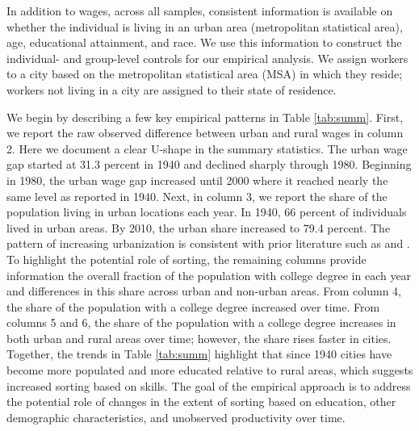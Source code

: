 \documentclass[12pt]{article}
\begin{document}
In addition to wages, across all samples, consistent information is available on whether the individual is living in an urban area (metropolitan statistical area), age, educational attainment, and race.
We use this information to construct the individual- and group-level controls for our empirical analysis.
We assign workers to a city based on the metropolitan statistical area (MSA) in which they reside; workers not living in a city are assigned to their state of residence. 

We begin by describing a few key empirical patterns in Table \ref{tab:summ}.
First, we report the raw observed difference between urban and rural wages in column 2.
Here we document a clear U-shape in the summary statistics.
The urban wage gap started at 31.3 percent in 1940 and declined sharply through 1980.
Beginning in 1980, the urban wage gap increased until 2000 where it reached nearly the same level as reported in 1940.
Next, in column 3, we report the share of the population living in urban locations each year.
In 1940, 66 percent of individuals lived in urban areas.
By 2010, the urban share increased to 79.4 percent.
The pattern of increasing urbanization is consistent with prior literature such as \citet{moretti2013real} and \citet{Boustan_Bunten_Hearey_2013}.
To highlight the potential role of sorting, the remaining columns provide information the overall fraction of the population with college degree in each year and differences in this share across urban and non-urban areas.
From column 4, the share of the population with a college degree increased over time.
From columns 5 and 6, the share of the population with a college degree increases in both urban and rural areas over time; however, the share rises faster in cities.
Together, the trends in Table \ref{tab:summ} highlight that since 1940 cities have become more populated and more educated relative to rural areas, which suggests increased sorting based on skills.
The goal of the empirical approach is to address the potential role of changes in the extent of sorting based on education, other demographic characteristics, and unobserved productivity over time.  
\end{document}
